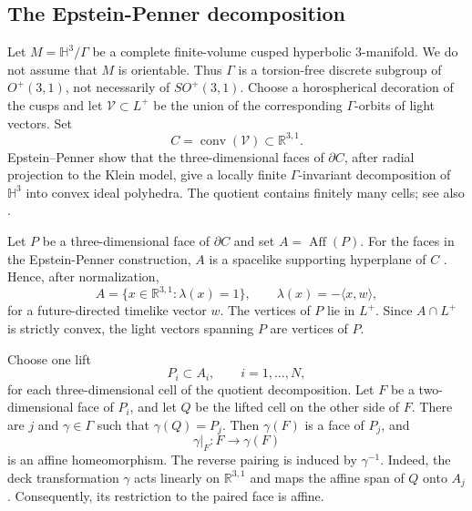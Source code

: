 \documentclass[oneside,a4paper,12pt]{article}
\newcommand{\R}{\mathbb R}
\renewcommand{\H}{\mathbb{H}}
\newcommand{\Aff}{\operatorname{Aff}}
\theoremstyle{plain}
\theoremstyle{definition}
\theoremstyle{remark}
\numberwithin{equation}{section}
\begin{document}
\subsection{The Epstein-Penner decomposition}\label{subsection:EP}
Let $M=\H^3/\Gamma$ be a complete finite-volume cusped hyperbolic $3$-manifold. We do not assume that $M$ is orientable. Thus
$\Gamma$ is a torsion-free discrete subgroup of
$O^+(3,1)$, not necessarily of $SO^+(3,1)$. Choose a horospherical decoration of the cusps and let $\mathcal V\subset L^+$ be the union of the corresponding $\Gamma$-orbits of light vectors. Set
\begin{equation}
C=\operatorname{conv}(\mathcal V)\subset\R^{3,1}.
  \nonumber \end{equation}
Epstein--Penner \cite{EP} show that the three-dimensional faces of $\partial C$, after radial projection to the Klein model, give a locally finite $\Gamma$-invariant decomposition of $\H^3$ into convex ideal polyhedra. The quotient contains finitely many cells; see also \cite{Akiyoshi}.

Let $P$ be a three-dimensional face of $\partial C$ and set $A=\Aff(P)$. For the faces in the Epstein-Penner construction, $A$ is a spacelike supporting hyperplane of $C$ \cite{EP}. Hence, after normalization,
\begin{equation}\label{equation:support-plane-prelim}
A=\{x\in\R^{3,1}:\lambda(x)=1\},\qquad
\lambda(x)=-\langle x,w\rangle,
\end{equation}
for a future-directed timelike vector $w$. The vertices of $P$ lie in $L^+$. Since $A\cap L^+$ is strictly convex, the light vectors spanning $P$ are vertices of $P$.

Choose one lift
\begin{equation}
P_i\subset A_i,\qquad i=1,\ldots,N,
  \nonumber \end{equation}
for each three-dimensional cell of the quotient decomposition. Let $F$ be a two-dimensional face of $P_i$, and let $Q$ be the lifted cell on the other side of $F$. There are $j$ and $\gamma\in\Gamma$ such that $\gamma(Q)=P_j$. Then $\gamma(F)$ is a face of $P_j$, and
\begin{equation}
\gamma|_F:F\longrightarrow\gamma(F)
  \nonumber \end{equation}
is an affine homeomorphism. The reverse pairing is induced by $\gamma^{-1}$. Indeed, the deck transformation $\gamma$ acts
linearly on $\mathbb R^{3,1}$ and maps the affine
span of $Q$ onto $A_j$. Consequently, its
restriction to the paired face is affine.
\end{document}
